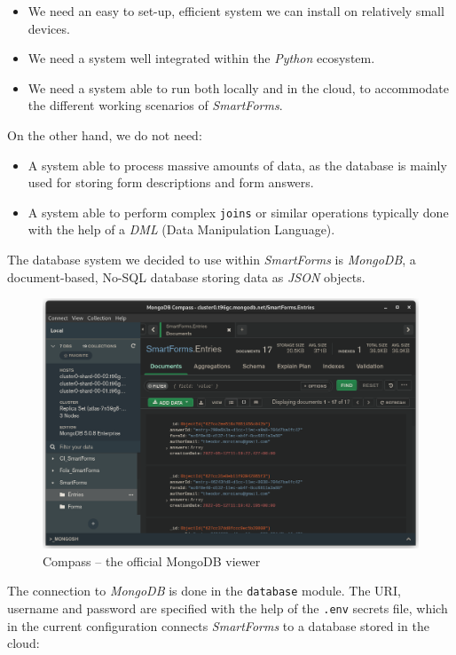 \documentclass[11pt, a4paper]{report}
\def\code#1{\texttt{#1}}
\begin{document}
\begin{itemize}
    \item We need an easy to set-up, efficient system we can install on relatively small devices.
    \item We need a system well integrated within the \textit{Python} ecosystem.
    \item We need a system able to run both locally and in the cloud, to accommodate the different working scenarios of \textit{SmartForms}.
\end{itemize}

On the other hand, we do not need:
\begin{itemize}
    \item A system able to process massive amounts of data, as the database is mainly used for storing form descriptions and form answers.
    \item A system able to perform complex \code{joins} or similar operations typically done with the help of a \textit{DML} (Data Manipulation Language). 
\end{itemize}

The database system we decided to use within \textit{SmartForms} is \textit{MongoDB}, a document-based, No-SQL database storing data as \textit{JSON} objects.


\begin{figure}[!h]
    \centering
    \includegraphics[width=35em]{images/screenshoots/mongo-compas.png}
    \caption{Compass -- the official MongoDB viewer}
    \label{fig:label}
\end{figure}

The connection to \textit{MongoDB} is done in the \code{database} module. The URI, username and password are specified with the help of the \code{.env} secrets file, which in the current configuration connects \textit{SmartForms} to a database stored in the cloud:
\end{document}
